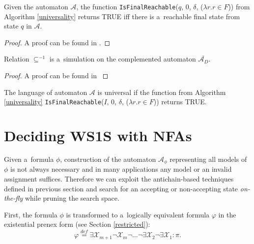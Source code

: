 \begin{lemma}\label{search-is-correct}
 Given the automaton $\mathcal{A}$, the function
 \texttt{IsFinalReachable}($q$, $0$, $\delta$, ($\lambda r. r \in F$)) from
 Algorithm \ref{universality} returns \textsc{TRUE} iff there is a~reachable
 final state from state $q$ in $\mathcal{A}$.
\end{lemma}
\begin{proof}
 A proof can be found in \cite{raskin}.
\end{proof}
\newpage
\begin{lemma}\label{simulation-in-ca}
Relation $\subseteq^{-1}$ is a~simulation on the complemented automaton
$\overline{\mathcal{A}_D}$.
\end{lemma}
\begin{proof}
 A proof can be found in \cite{raskin}
\end{proof}

\begin{lemma}
The language of automaton $\mathcal{A}$ is universal if the function from
Algorithm \ref{universality}
\texttt{IsFinalReachable}($I$, $0$, $\delta$, ($\lambda r. r \in F$)) returns
\textsc{TRUE}.
\end{lemma}

\section{Deciding WS1S with NFAs}

Given a~formula $\phi$, construction of the automaton $\mathcal{A}_\phi$
representing all models of $\phi$ is not always necessary and in many
applications any model or an invalid assignment suffices.
Therefore we can exploit the antichain-based techniques defined in previous
section and search for an accepting or non-accepting state \emph{on-the-fly}
while pruning the search space.

First, the formula $\phi$ is transformed to a~logically equivalent formula
$\varphi$ in the existential prenex form (see Section \ref{restricted}):
\begin{equation*}
 \varphi \overset{\mathit{def}}{=}
 \exists\mathcal{X}_{m+1}\neg\mathcal{X}_m\neg\ldots\neg\exists\mathcal{X}_2\neg\exists\mathcal{X}_1
 :
 \pi.
\end{equation*}

